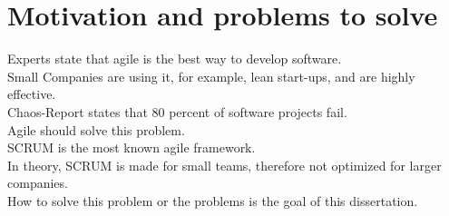 % 
\section*{Motivation and problems to solve}

Experts state that agile is the best way to develop software.\\
Small Companies are using it, for example, lean start-ups, and are highly effective.\\
Chaos-Report states that 80 percent of software projects fail.\\
Agile should solve this problem.\\
SCRUM is the most known agile framework.\\
In theory, SCRUM is made for small teams, therefore not optimized for larger companies.\\
How to solve this problem or the problems is the goal of this dissertation.\\